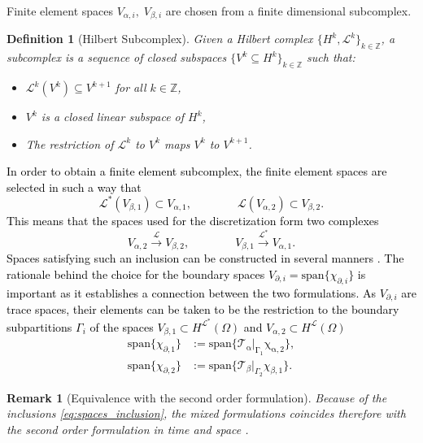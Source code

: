 \documentclass[11pt,a4paper]{article}
\newtheorem{remark}{Remark}
\newtheorem{definition}{Definition}
\newcommand{\revone}[1]{{\textcolor{black}{#1}}}
\begin{document}
 Finite element spaces $V_{\alpha, i}, \; V_{\beta, i}$ are chosen from a finite dimensional subcomplex.
\begin{definition}[Hilbert Subcomplex]
Given a Hilbert complex $\{H^k, \mathcal{L}^k\}_{k \in \mathbb{Z}}$, a \textit{subcomplex} is a sequence of closed subspaces $\{V^k \subseteq H^k\}_{k \in \mathbb{Z}}$ such that:
\begin{itemize}
    \item $\mathcal{L}^k(V^k) \subseteq V^{k+1}$ for all $k \in \mathbb{Z}$,
    \item $V^k$ is a closed linear subspace of $H^k$,
    \item The restriction of $\mathcal{L}^k$ to $V^k$ maps $V^k$ to $V^{k+1}$.
\end{itemize}
\end{definition}
\revone{In order to obtain a finite element subcomplex, the finite element spaces are selected in such a way that
\begin{equation}\label{eq:spaces_inclusion}
    \mathcal{L}^*(V_{\beta, 1}) \subset V_{\alpha, 1}, \qquad \qquad \mathcal{L}(V_{\alpha, 2}) \subset V_{\beta, 2}.
\end{equation}
This means that the spaces used for the discretization form two complexes
$$
V_{\alpha, 2} \xrightarrow{\mathcal{L}} V_{\beta, 2}, \qquad \qquad V_{\beta, 1} \xrightarrow{\mathcal{L}^*} V_{\alpha, 1}.
$$
Spaces satisfying such an inclusion can be constructed in several manners \cite{arnold2006finite,bochev2006principles,palha2014physics}. The rationale behind the choice for the boundary spaces $V_{\partial, i} = \mathrm{span}\{\chi_{\partial, i}\}$ is important as it establishes a connection between the two formulations. As $V_{\partial, i}$ are trace spaces, their elements can be taken to be the restriction to the boundary subpartitions $\Gamma_i$ of the spaces $V_{\beta, 1} \subset H^{\mathcal{L}^*}(\Omega)$ and $V_{\alpha, 2} \subset H^{\mathcal{L}}(\Omega)$ 
\begin{equation}\label{eq:boundary_basis_boundary} 
\begin{aligned}
    \mathrm{span}\{\chi_{\partial, 1}\} &:= \mathrm{span} \{\mathrm{\mathcal{T}_\alpha|_{\Gamma_1}\chi_{\alpha, 2}}\}, \\
    \mathrm{span}\{\chi_{\partial, 2}\} &:= \mathrm{span} \{\mathcal{T}_\beta|_{\Gamma_2} \chi_{\beta, 1}\}.
\end{aligned}
\end{equation}
}

\begin{remark}[Equivalence with the second order formulation]
Because of the inclusions \eqref{eq:spaces_inclusion}, the mixed formulations coincides therefore with the second order formulation in time and space \cite{joly2003}.
\end{remark}
\end{document}
